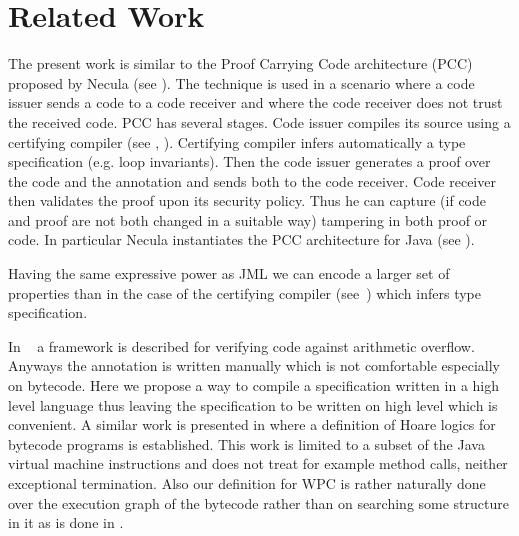 \section{Related Work} \label{relWork}
The present work is similar to the Proof Carrying Code architecture (PCC) proposed by Necula (see \cite{Necula97}). The technique is used in a scenario where a code issuer sends a code to a code receiver and where the code receiver does not trust the received code. PCC has several stages. Code issuer compiles its source using a certifying compiler (see \cite{ComNec}, \cite{DesNecLee98}). Certifying compiler infers automatically a type specification (e.g. loop invariants). Then the code issuer generates a proof over the code and the annotation and sends both to the code receiver. Code receiver then validates the proof upon its security policy. Thus he can capture (if code and proof are not both changed in a suitable way) tampering in both proof or code. In particular Necula instantiates the PCC architecture for Java (see \cite{ProColLeeNec}).  

 Having the same expressive power as JML we can encode a larger set of properties than in the case of the certifying compiler (see~\cite{DesNecLee98}) which infers type specification.

In ~\cite{WildmoserN-ESOP05} a  framework is described for verifying code against arithmetic overflow. Anyways the annotation is written manually which is not comfortable especially on bytecode. Here we propose a way to compile a specification written in a high level language thus leaving the specification to be written on high level which is convenient.%
A similar work is presented in \cite{Quigley} where a definition of Hoare logics for bytecode programs is established. This work is limited to a subset of the Java virtual machine instructions and does not treat for example method calls, neither exceptional termination. Also our definition for WPC is rather naturally done over the execution graph of the bytecode rather than on searching some structure in it as is done in \cite{Quigley}.
